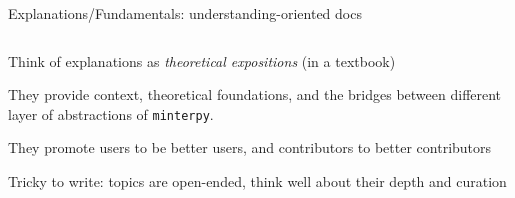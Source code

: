\documentclass[english,aspectratio=169]{beamer}
\let\tempone\itemize
\let\temptwo\enditemize
\renewenvironment{itemize}{\tempone\addtolength{\itemsep}{0.35\baselineskip}}{\temptwo}
\begin{document}
\begin{frame}{Explanations/Fundamentals: understanding-oriented docs}
\footnotesize

\begin{columns}[onlytextwidth]

\begin{column}{0.5\textwidth}

\begin{itemize}
    \item Think of explanations as \emph{theoretical expositions} (in a textbook)
    \item They provide context, theoretical foundations,
          and the bridges between different layer of abstractions of \texttt{minterpy}.
    \item They promote users to be better users,
          and contributors to better contributors
    \item Tricky to write: topics are open-ended,
          think well about their depth and curation
\end{itemize}

\end{column}


\end{columns}
\end{frame}
\end{document}
